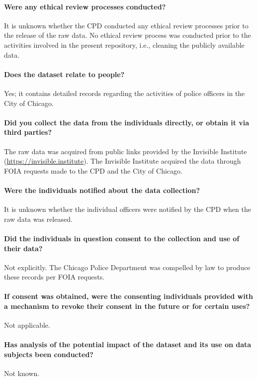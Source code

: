 \paragraph{Were any ethical review processes conducted?}
It is unknown whether the CPD conducted any ethical review processes prior to the release
of the raw data. No ethical review process was conducted prior to the activities
involved in the present repository, i.e., cleaning the publicly available data.

\paragraph{Does the dataset relate to people?}
Yes; it contains detailed records regarding the activities of police officers in the City of Chicago.

\paragraph{Did you collect the data from the individuals directly, or obtain it via third parties?}
The raw data was acquired from public links provided by the Invisible Institute (\url{https://invisible.institute}).
The Invisible Institute acquired the data through FOIA requests made to the CPD and the City of Chicago.

\paragraph{Were the individuals notified about the data collection?}
It is unknown whether the individual officers were notified by the CPD when the raw data was released. 

\paragraph{Did the individuals in question consent to the collection and use of their data?}
Not explicitly. The Chicago Police Department was compelled by law to produce these records per FOIA requests.

\paragraph{If consent was obtained, were the consenting individuals provided with a mechanism to revoke their consent in the future or for certain uses?}
Not applicable.

\paragraph{Has analysis of the potential impact of the dataset and its use on data subjects been conducted?}
Not known.

